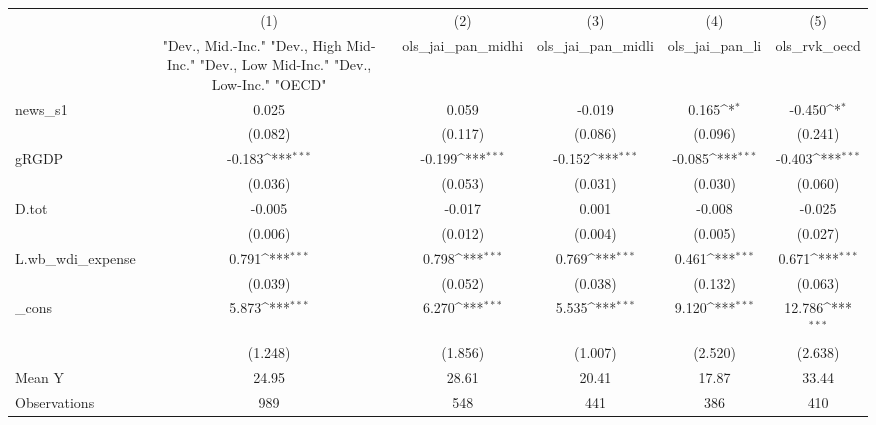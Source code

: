 {
\def\sym#1{\ifmmode^{#1}\else\(^{#1}\)\fi}
\begin{tabular}{l*{5}{c}}
\toprule
            &\multicolumn{1}{c}{(1)}&\multicolumn{1}{c}{(2)}&\multicolumn{1}{c}{(3)}&\multicolumn{1}{c}{(4)}&\multicolumn{1}{c}{(5)}\\
            &\multicolumn{1}{c}{ "Dev., Mid.-Inc." "Dev., High Mid-Inc." "Dev., Low Mid-Inc." "Dev., Low-Inc." "OECD" }&\multicolumn{1}{c}{ols\_jai\_pan\_midhi}&\multicolumn{1}{c}{ols\_jai\_pan\_midli}&\multicolumn{1}{c}{ols\_jai\_pan\_li}&\multicolumn{1}{c}{ols\_rvk\_oecd}\\
\midrule
news\_s1     &       0.025         &       0.059         &      -0.019         &       0.165\sym{*}  &      -0.450\sym{*}  \\
            &     (0.082)         &     (0.117)         &     (0.086)         &     (0.096)         &     (0.241)         \\
\addlinespace
gRGDP       &      -0.183\sym{***}&      -0.199\sym{***}&      -0.152\sym{***}&      -0.085\sym{***}&      -0.403\sym{***}\\
            &     (0.036)         &     (0.053)         &     (0.031)         &     (0.030)         &     (0.060)         \\
\addlinespace
D.tot       &      -0.005         &      -0.017         &       0.001         &      -0.008         &      -0.025         \\
            &     (0.006)         &     (0.012)         &     (0.004)         &     (0.005)         &     (0.027)         \\
\addlinespace
L.wb\_wdi\_expense&       0.791\sym{***}&       0.798\sym{***}&       0.769\sym{***}&       0.461\sym{***}&       0.671\sym{***}\\
            &     (0.039)         &     (0.052)         &     (0.038)         &     (0.132)         &     (0.063)         \\
\addlinespace
\_cons      &       5.873\sym{***}&       6.270\sym{***}&       5.535\sym{***}&       9.120\sym{***}&      12.786\sym{***}\\
            &     (1.248)         &     (1.856)         &     (1.007)         &     (2.520)         &     (2.638)         \\
\midrule
Mean Y      &       24.95         &       28.61         &       20.41         &       17.87         &       33.44         \\
Observations&         989         &         548         &         441         &         386         &         410         \\
\bottomrule
\end{tabular}
}
